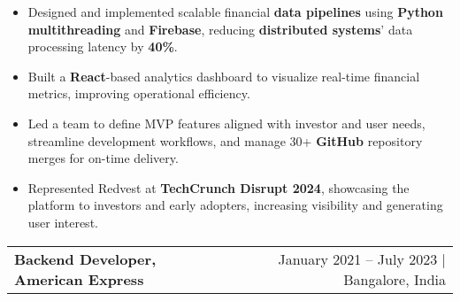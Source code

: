 \documentclass[10pt, legalpaper]{article}
\newenvironment{highlights}{
    \begin{itemize}[
        topsep=0.10 cm,
        parsep=0.10 cm,
        partopsep=0pt,
        itemsep=0pt,
        leftmargin=0 cm + 10pt
    ]
}{
    \end{itemize}
}
\newenvironment{onecolentry}{
    \par\noindent
}{
    \par
}
\begin{document}
\begin{onecolentry}
    \begin{highlights}
        \item Designed and implemented scalable financial \textbf{data pipelines} using \textbf{Python multithreading} and \textbf{Firebase}, reducing \textbf{distributed systems}' data processing latency by \textbf{40\%}.
        \item Built a \textbf{React}-based analytics dashboard to visualize real-time financial metrics, improving operational efficiency.
        \item Led a team to define MVP features aligned with investor and user needs, streamline development workflows, and manage 30+ \textbf{GitHub} repository merges for on-time delivery.
        \item Represented Redvest at \textbf{TechCrunch Disrupt 2024}, showcasing the platform to investors and early adopters, increasing visibility and generating user interest.
    \end{highlights}
\end{onecolentry}

\vspace{0.0 cm}


\begin{tabularx}{\textwidth}{@{}Xr@{}}
    \textbf{Backend Developer, American Express} & January 2021 – July 2023 | Bangalore, India \\
\end{tabularx}
\vspace{-4.0mm}
\end{document}
